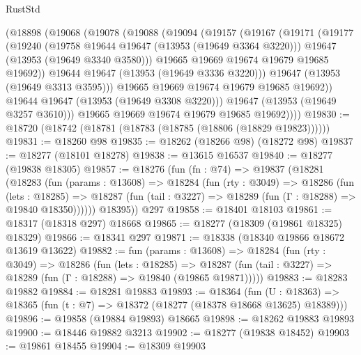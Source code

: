 \begin{lexlean}{RustStd}
\begin{coremodule}
          (@18898
            (@19068
              (@19078
                (@19088
                  (@19094
                    (@19157
                      (@19167
                        (@19171
                          (@19177
                            (@19240
                              (@19758 @19644 @19647 (@13953 (@19649 @3364 @3220)))
                              @19647
                              (@13953 (@19649 @3340 @3580)))
                            @19665
                            @19669
                            @19674
                            @19679
                            @19685
                            @19692))
                        @19644
                        @19647
                        (@13953 (@19649 @3336 @3220)))
                      @19647
                      (@13953 (@19649 @3313 @3595)))
                    @19665
                    @19669
                    @19674
                    @19679
                    @19685
                    @19692))
                @19644
                @19647
                (@13953 (@19649 @3308 @3220)))
              @19647
              (@13953 (@19649 @3257 @3610)))
            @19665
            @19669
            @19674
            @19679
            @19685
            @19692))))
@19830 := @18720 (@18742 (@18781 (@18783 (@18785 (@18806 (@18829 @19823))))))
@19831 := @18260 @98
@19835 := @18262 (@18266 @98) (@18272 @98)
@19837 := @18277 (@18101 @18278)
@19838 := @13615 @16537
@19840 := @18277 (@19838 @18305)
@19857 := @18276
    (fun (fn : @74) =>
    @19837
      (@18281
        (@18283
          (fun (params : @13608) =>
          @18284
            (fun (rty : @3049) =>
            @18286
              (fun (lets : @18285) =>
              @18287 (fun (tail : @3227) => @18289 (fun (Γ : @18288) => @19840 @18350))))))
        @18395))
    @297
@19858 := @18401 @18103
@19861 := @18317 (@18318 @297) @18668
@19865 := @18277 (@18309 (@19861 @18325) @18329)
@19866 := @18341 @297
@19871 := @18338 (@18340 @19866 @18672 @13619 @13622)
@19882 := fun (params : @13608) =>
  @18284
    (fun (rty : @3049) =>
    @18286
      (fun (lets : @18285) =>
      @18287 (fun (tail : @3227) => @18289 (fun (Γ : @18288) => @19840 (@19865 @19871)))))
@19883 := @18283 @19882
@19884 := @18281 @19883
@19893 := @18364
    (fun (U : @18363) => @18365 (fun (t : @7) => @18372 (@18277 (@18378 @18668 @13625) @18389)))
@19896 := @19858 (@19884 @19893) @18665
@19898 := @18262 @19883 @19893
@19900 := @18446 @19882 @3213
@19902 := @18277 (@19838 @18452)
@19903 := @19861 @18455
@19904 := @18309 @19903

\end{coremodule}
\end{lexlean}
